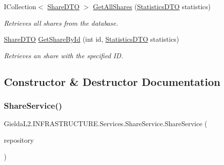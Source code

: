 \begin{DoxyCompactItemize}
I\+Collection$<$ \mbox{\hyperlink{class_gielda_l2_1_1_i_n_f_r_a_s_t_r_u_c_t_u_r_e_1_1_d_t_o_1_1_share_d_t_o}{Share\+D\+TO}} $>$ \mbox{\hyperlink{class_gielda_l2_1_1_i_n_f_r_a_s_t_r_u_c_t_u_r_e_1_1_services_1_1_share_service_adfa90ea57786eddc34961f73e6eadc23}{Get\+All\+Shares}} (\mbox{\hyperlink{class_gielda_l2_1_1_i_n_f_r_a_s_t_r_u_c_t_u_r_e_1_1_d_t_o_1_1_statistics_d_t_o}{Statistics\+D\+TO}} statistics)
\begin{DoxyCompactList}\small\item\em Retrieves all shares from the database. \end{DoxyCompactList}\item 
\mbox{\hyperlink{class_gielda_l2_1_1_i_n_f_r_a_s_t_r_u_c_t_u_r_e_1_1_d_t_o_1_1_share_d_t_o}{Share\+D\+TO}} \mbox{\hyperlink{class_gielda_l2_1_1_i_n_f_r_a_s_t_r_u_c_t_u_r_e_1_1_services_1_1_share_service_a969e5f377b0d726ea6b891d9c42315b6}{Get\+Share\+By\+Id}} (int id, \mbox{\hyperlink{class_gielda_l2_1_1_i_n_f_r_a_s_t_r_u_c_t_u_r_e_1_1_d_t_o_1_1_statistics_d_t_o}{Statistics\+D\+TO}} statistics)
\begin{DoxyCompactList}\small\item\em Retrieves an share with the specified ID. \end{DoxyCompactList}\end{DoxyCompactItemize}


\subsection{Constructor \& Destructor Documentation}
\mbox{\label{class_gielda_l2_1_1_i_n_f_r_a_s_t_r_u_c_t_u_r_e_1_1_services_1_1_share_service_a962d3e4973cb768f95f619bea0c06173}} 
\subsubsection{\texorpdfstring{ShareService()}{ShareService()}}
{\footnotesize\ttfamily Gielda\+L2.\+I\+N\+F\+R\+A\+S\+T\+R\+U\+C\+T\+U\+R\+E.\+Services.\+Share\+Service.\+Share\+Service (\begin{DoxyParamCaption}\item[{\mbox{\hyperlink{interface_gielda_l2_1_1_d_b_1_1_interfaces_1_1_i_share_repository}{I\+Share\+Repository}}}]{repository }\end{DoxyParamCaption})}



